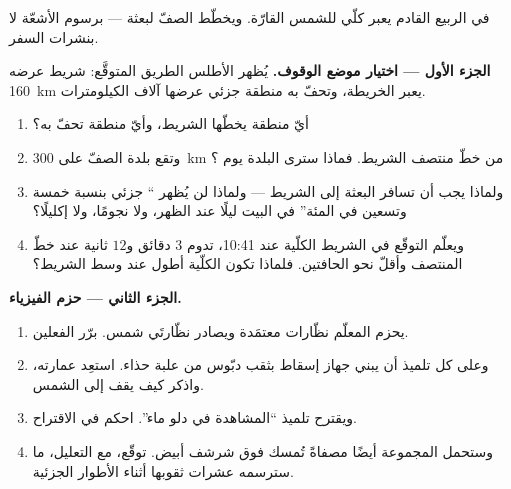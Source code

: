 \begin{problem}\label{pb:g7:shadows-eclipses:1}
في الربيع القادم يعبر  كلّي للشمس القارّة. ويخطّط الصفّ
لبعثة --- برسوم الأشعّة لا بنشرات السفر.

\medskip\noindent\textbf{الجزء الأول --- اختيار موضع الوقوف.}
يُظهر الأطلس الطريق المتوقَّع: شريط عرضه \qty{160}{km} يعبر
الخريطة، وتحفّ به منطقة  جزئي عرضها آلاف الكيلومترات.
\begin{enumerate}
  \item أيّ منطقة  يخطّها الشريط، وأيّ منطقة تحفّ به؟
  \item وتقع بلدة الصفّ على \qty{300}{km} من خطّ منتصف الشريط.
        فماذا سترى البلدة يوم ؟
  \item ولماذا يجب أن تسافر البعثة إلى الشريط --- ولماذا لن
        يُظهر `` جزئي بنسبة خمسة وتسعين في المئة'' في
        البيت ليلًا عند الظهر، ولا نجومًا، ولا إكليلًا؟
  \item ويعلّم التوقّع في الشريط الكلّية عند 10:41، تدوم $3$
        دقائق و$12$ ثانية عند خطّ المنتصف وأقلّ نحو الحافتين.
        فلماذا تكون الكلّية أطول عند وسط الشريط؟
\end{enumerate}

\medskip\noindent\textbf{الجزء الثاني --- حزم الفيزياء.}
\begin{enumerate}[resume]
  \item يحزم المعلّم نظّارات  معتمَدة ويصادر نظّارتَي شمس.
        برّر الفعلين.
  \item وعلى كل تلميذ أن يبني جهاز إسقاط بثقب دبّوس من علبة
        حذاء. استعِد عمارته، واذكر كيف يقف  إلى
        الشمس.
  \item ويقترح تلميذ ``المشاهدة في  دلو ماء''. احكم في
        الاقتراح.
  \item وستحمل المجموعة أيضًا مصفاةً تُمسك فوق شرشف أبيض.
        توقّع، مع التعليل، ما سترسمه عشرات ثقوبها أثناء
        الأطوار الجزئية.
\end{enumerate}


\end{problem}
